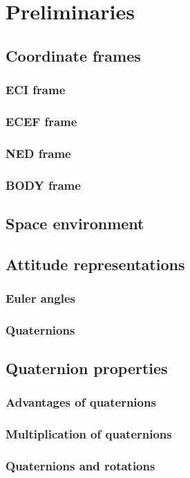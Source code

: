 \documentclass[12pt,a4paper,oneside]{article}
\begin{document}
\newpage
\section{Preliminaries}
\subsection{Coordinate frames}
\subsubsection{ECI frame}
\cite{larson1992space}
\subsubsection{ECEF frame}
\subsubsection{NED frame}
\subsubsection{BODY frame}
\subsection{Space environment}
\subsection{Attitude representations}
\subsubsection{Euler angles}
\subsubsection{Quaternions}
\subsection{Quaternion properties}
\subsubsection{Advantages of quaternions}
\subsubsection{Multiplication of quaternions}
\subsubsection{Quaternions and rotations}
\end{document}
